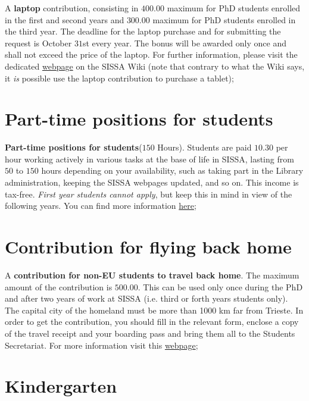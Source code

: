 \documentclass{sissavademecum}
\begin{document}
A \textbf{laptop} contribution, consisting in \EUR{} $400.00$ maximum for PhD students enrolled in the first and second years and \EUR{} $300.00$ maximum for PhD students enrolled in the third year. The deadline for the laptop purchase and for submitting the request is October $31$st every year. The bonus will be awarded only once and shall not exceed the price of the laptop. For further information, please visit the dedicated \href{http://wiki.sissa.it/students/index.php/Laptop_contribution}{webpage} on the SISSA Wiki (note that contrary to what the Wiki says, it \emph{is} possible use the laptop contribution to purchase a tablet);
    

\section{Part-time positions for students}

\textbf{Part-time positions for students}($150$ Hours). Students are paid \EUR{} $10.30$ per hour working actively in various tasks at the base of life in SISSA, lasting from $50$ to $150$ hours depending on your availability, such as taking part in the Library administration, keeping the SISSA webpages updated, and so on. This income is tax-free. \textit{First year students cannot apply}, but keep this in mind in view of the following years. You can find more information \href{http://wiki.sissa.it/students/index.php/150_hours}{here};


\section{Contribution for flying back home}

A \textbf{contribution for non-EU students to travel back home}. The maximum amount of the contribution is \EUR{} $500.00$. This can be used only once during the PhD and after two years of work at SISSA (i.e. third or forth years students only). The capital city of the homeland must be more than 1000 km far from Trieste. In order to get the contribution, you should fill in the relevant form, enclose a copy of the travel receipt and your boarding pass and bring them all to the Students Secretariat. For more information visit this \href{http://wiki.sissa.it/students/index.php/Travel_grant_contribution}{webpage};
    
   
\section{Kindergarten}
\end{document}
